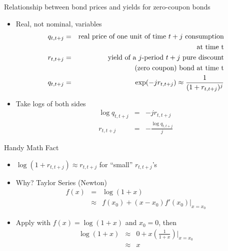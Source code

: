 \documentclass[professionalfonts,small]{beamer}
\newcommand{\STRUT}{\rule{0in}{3ex}}
\begin{document}
\begin{frame}{Relationship between bond prices and yields for zero-coupon bonds}

\footnotesize
\begin{itemize}

\item Real, not nominal, variables
\begin{eqnarray*}
q_{t,t+j} &=& \mbox{real price of one unit of time $t+j$ consumption}\\
          &&  \mbox{at time t}\\
r_{t,t+j} &=& \mbox{yield of a $j$-period $t+j$ pure discount}\\
           && \mbox{(zero coupon) bond at time t} \\
q_{t,t+j} &=& \exp(-j r_{t,t+j}) \approx \frac{1}{(1+r_{t,t+j})^j} \STRUT
\end{eqnarray*}

\item Take logs of both sides
\begin{eqnarray*}
\log q_{t,t+j} &=& -j r_{t,t+j} \\
r_{t,t+j} &=& - \frac{\log q_{t,t+j}}{j}
\end{eqnarray*}

\end{itemize}

\end{frame}

\begin{frame}{Handy Math Fact}
\footnotesize

\begin{itemize}

\item $\log (1+ r_{t,t+j}) \approx r_{t,t+j}$ for ``small'' $r_{t,t+j}$'s

\medskip

\item Why?  Taylor Series (Newton)
\begin{eqnarray*}
f(x) &=& \log(1+x)\\
     &\approx& f(x_0) + (x-x_0)f'(x_0) |_{x=x_0}
\end{eqnarray*}

\medskip

\item Apply with $f(x) = \log(1+x)$ and $x_0 = 0$, then
\begin{eqnarray*}
\log(1+x) &\approx& 0 + x\left(\frac{1}{1+x}\right) |_{x=x_0} \\
          &\approx& x
\end{eqnarray*}

\end{itemize}

\end{frame}
\end{document}
